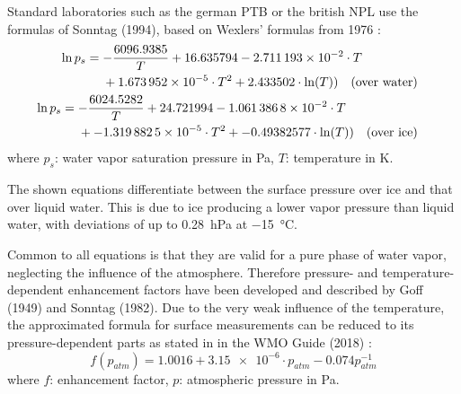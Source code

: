 Standard laboratories such as the german \gls{PTB} or the british \gls{NPL} use the formulas of Sonntag (1994), based on Wexlers' formulas from 1976 \autocite{dirksenEinheitlichesBerechnungsverfahrenFuer2019}:
\begin{subequations}\label{e:sonntag}
\begin{align}
\begin{split}
    \ln{p_s} &= \begin{aligned}[t]
    &\mathrlap{-\frac{6096.9385}{T} + 16.635794 - \num{2.711193e-2} \cdot T} \\
    &+ \num{1.673952e-5} \cdot T^2 + 2.433502 \cdot \ln(T)) & \text{(over water)}
    \end{aligned}
\end{split}
\label{e:transverse_straincore} 
\\
\begin{split}
    \ln{p_s} &= \begin{aligned}[t]
    &\mathrlap{-\frac{6024.5282}{T} + 24.721994 - \num{1.0613868E-2} \cdot T} \\
    &+ \num{-1.3198825E-5} \cdot T^2 + -0.49382577 \cdot \ln(T)) & \text{(over ice)}
    \end{aligned}
\end{split}
\label{e:transverse_straincoore} 
\end{align}
\end{subequations}
where 
$p_s$: water vapor saturation pressure in \unit{\pascal}, 
$T$: temperature in \unit{\kelvin}.

The shown equations differentiate between the surface pressure over ice and that over liquid water. This is due to ice producing a lower vapor pressure than liquid water, with deviations of up to \qty{0.28}{\hecto\pascal} at \qty{-15}{\celsius}.

Common to all equations is that they are valid for a pure phase of water vapor, neglecting the influence of the atmosphere. Therefore pressure- and temperature-dependent enhancement factors have been developed and described by Goff (1949) and Sonntag (1982). 
Due to the very weak influence of the temperature, the approximated formula for surface measurements can be reduced to its pressure-dependent parts as stated in in the WMO Guide (2018) \autocite{buckNewEquationsComputing1981,worldmeteorologicalorganizationMeasurementMeteorologicalVariables2018}:
\begin{equation}
    f(p_{atm}) = 1.0016 + \num{3.15e-6} \cdot p_{atm} - 0.074p_{atm}^{-1}
\end{equation}
where
$f$: enhancement factor, 
$p$: atmospheric pressure in \unit{\pascal}.

